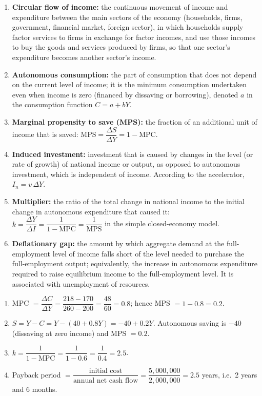 \documentclass[11pt]{article}
\begin{document}
\begin{corrige}
\begin{enumerate}
\item \textbf{Circular flow of income:} the continuous movement of income and expenditure between the main sectors of the economy (households, firms, government, financial market, foreign sector), in which households supply factor services to firms in exchange for factor incomes, and use those incomes to buy the goods and services produced by firms, so that one sector's expenditure becomes another sector's income.
\item \textbf{Autonomous consumption:} the part of consumption that does not depend on the current level of income; it is the minimum consumption undertaken even when income is zero (financed by dissaving or borrowing), denoted $a$ in the consumption function $C = a + bY$.
\item \textbf{Marginal propensity to save (MPS):} the fraction of an additional unit of income that is saved: $\text{MPS} = \dfrac{\Delta S}{\Delta Y} = 1 - \text{MPC}$.
\item \textbf{Induced investment:} investment that is caused by changes in the level (or rate of growth) of national income or output, as opposed to autonomous investment, which is independent of income. According to the accelerator, $I_n = v\,\Delta Y$.
\item \textbf{Multiplier:} the ratio of the total change in national income to the initial change in autonomous expenditure that caused it: $k = \dfrac{\Delta Y}{\Delta I} = \dfrac{1}{1 - \text{MPC}} = \dfrac{1}{\text{MPS}}$ in the simple closed-economy model.
\item \textbf{Deflationary gap:} the amount by which aggregate demand at the full-employment level of income falls short of the level needed to purchase the full-employment output; equivalently, the increase in autonomous expenditure required to raise equilibrium income to the full-employment level. It is associated with unemployment of resources.
\end{enumerate}
\end{corrige}

\begin{corrige}
\begin{enumerate}
\item MPC $= \dfrac{\Delta C}{\Delta Y} = \dfrac{218 - 170}{260 - 200} = \dfrac{48}{60} = 0.8$; hence MPS $= 1 - 0.8 = 0.2$.
\item $S = Y - C = Y - (40 + 0.8Y) = -40 + 0.2Y$. Autonomous saving is $-40$ (dissaving at zero income) and MPS $= 0.2$.
\item $k = \dfrac{1}{1 - \text{MPC}} = \dfrac{1}{1 - 0.6} = \dfrac{1}{0.4} = 2.5$.
\item Payback period $= \dfrac{\text{initial cost}}{\text{annual net cash flow}} = \dfrac{5{,}000{,}000}{2{,}000{,}000} = 2.5$ years, i.e.\ 2 years and 6 months.
\end{enumerate}
\end{corrige}
\end{document}

